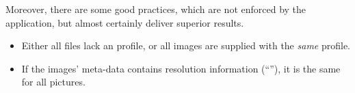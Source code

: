 Moreover, there are some good practices, which are not enforced by the application, but almost
certainly deliver superior results.

\begin{itemize}
\item
  Either all files lack an  profile, or all images are supplied with the
  \emph{same}  profile.

\item
  If the images' meta-data contains resolution information (``''), it is the same
  for all pictures.
\end{itemize}


